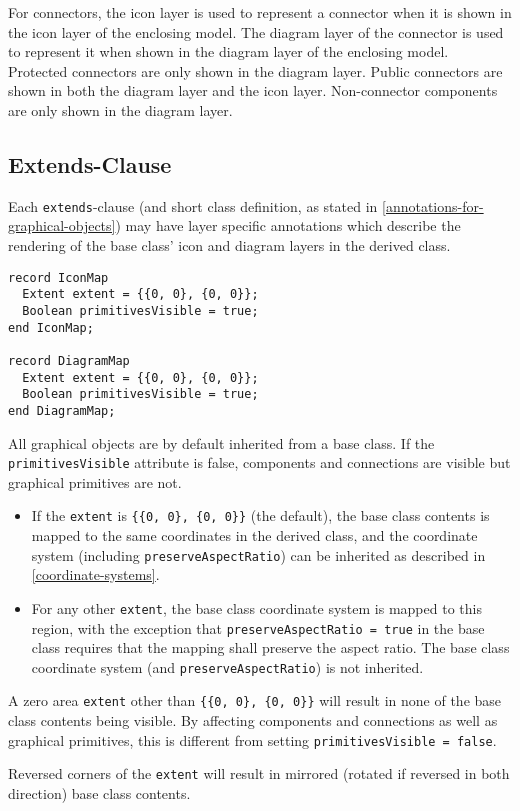 For connectors, the icon layer is used to represent a connector when it is shown in the icon layer of the enclosing model.
The diagram layer of the connector is used to represent it when shown in the diagram layer of the enclosing model.
Protected connectors are only shown in the diagram layer.
Public connectors are shown in both the diagram layer and the icon layer.
Non-connector components are only shown in the diagram layer.

\subsection{Extends-Clause}\label{extends-clause}

Each \lstinline!extends!-clause (and short class definition, as stated in \cref{annotations-for-graphical-objects}) may have layer specific annotations which describe the rendering of the base class' icon and diagram layers in the derived class.

\begin{lstlisting}[language=modelica]
record IconMap
  Extent extent = {{0, 0}, {0, 0}};
  Boolean primitivesVisible = true;
end IconMap;

record DiagramMap
  Extent extent = {{0, 0}, {0, 0}};
  Boolean primitivesVisible = true;
end DiagramMap;
\end{lstlisting}%
All graphical objects are by default inherited from a base class.
If the \lstinline!primitivesVisible! attribute is false, components and connections are visible but graphical primitives are not.

\begin{itemize}
\item
  If the \lstinline!extent! is \lstinline!{{0, 0}, {0, 0}}! (the default), the base class contents is mapped to the same coordinates in the derived class, and the coordinate system (including \lstinline!preserveAspectRatio!) can be inherited as described in \cref{coordinate-systems}.
\item
  For any other \lstinline!extent!, the base class coordinate system is mapped to this region, with the exception that \lstinline!preserveAspectRatio = true! in the base class requires that the mapping shall preserve the aspect ratio.
  The base class coordinate system (and \lstinline!preserveAspectRatio!) is not inherited.
\end{itemize}

\begin{nonnormative}
A zero area \lstinline!extent! other than \lstinline!{{0, 0}, {0, 0}}! will result in none of the base class contents being visible.
By affecting components and connections as well as graphical primitives, this is different from setting \lstinline!primitivesVisible = false!.

Reversed corners of the \lstinline!extent! will result in mirrored (rotated if reversed in both direction) base class contents.
\end{nonnormative}

